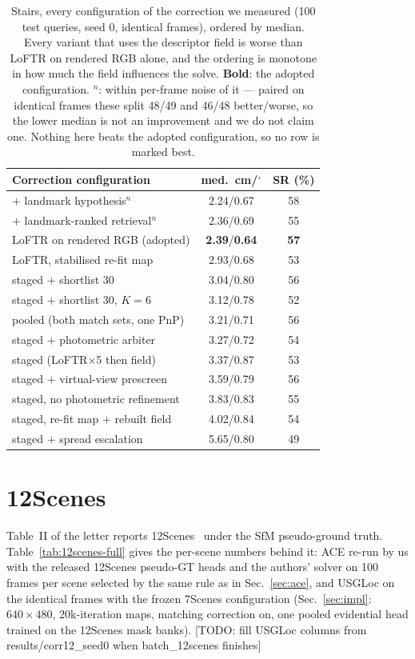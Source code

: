 \documentclass[journal]{IEEEtran}
\newcommand{\TODO}[1]{{\color{red}[TODO: #1]}}
\newcommand{\method}{USGLoc}
\begin{document}
\begin{table}[h]
\caption{Stairs, every configuration of the correction we measured (100 test
queries, seed 0, identical frames), ordered by median. Every variant that uses
the descriptor field is worse than LoFTR on rendered RGB alone, and the
ordering is monotone in how much the field influences the solve. \textbf{Bold}:
the adopted configuration. $^n$: within per-frame noise of it --- paired on
identical frames these split 48/49 and 46/48 better/worse, so the lower median
is not an improvement and we do not claim one. Nothing here beats the adopted
configuration, so no row is marked best.}
\label{tab:stairs-grid}
\centering\footnotesize
\setlength{\tabcolsep}{4pt}
\begin{tabular}{@{}lcc@{}}
\toprule
Correction configuration & med.\ cm/$^\circ$ & SR (\%)\\
\midrule
\quad $+$ landmark hypothesis$^n$ & 2.24/0.67 & 58\\
\quad $+$ landmark-ranked retrieval$^n$ & 2.36/0.69 & 55\\
LoFTR on rendered RGB (adopted) & \textbf{2.39}/\textbf{0.64} & \textbf{57}\\
LoFTR, stabilised re-fit map & 2.93/0.68 & 53\\
staged $+$ shortlist 30 & 3.04/0.80 & 56\\
staged $+$ shortlist 30, $K{=}6$ & 3.12/0.78 & 52\\
pooled (both match sets, one PnP) & 3.21/0.71 & 56\\
staged $+$ photometric arbiter & 3.27/0.72 & 54\\
staged (LoFTR$\times$5 then field) & 3.37/0.87 & 53\\
staged $+$ virtual-view prescreen & 3.59/0.79 & 56\\
staged, no photometric refinement & 3.83/0.83 & 55\\
staged, re-fit map $+$ rebuilt field & 4.02/0.84 & 54\\
staged $+$ spread escalation & 5.65/0.80 & 49\\
\bottomrule
\end{tabular}
\end{table}

\section{12Scenes}
\label{sec:12scenes}
Table~II of the letter reports 12Scenes~\cite{twelvescenes} under the SfM pseudo-ground truth. Table~\ref{tab:12scenes-full} gives the per-scene numbers behind it: ACE re-run by us with the released 12Scenes pseudo-GT heads and the authors' solver on 100 frames per scene selected by the same rule as in Sec.~\ref{sec:ace}, and \method{} on the identical frames with the frozen 7Scenes configuration (Sec.~\ref{sec:impl}: $640{\times}480$, 20k-iteration maps, matching correction on, one pooled evidential head trained on the 12Scenes mask banks). \TODO{fill \method{} columns from results/corr12\_seed0 when batch\_12scenes finishes}
\end{document}
